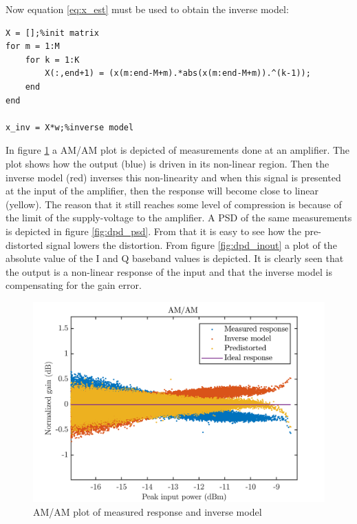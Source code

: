 Now equation \ref{eq:x_est} must be used to obtain the inverse model:

\begin{lstlisting}[frame = single]
X = [];%init matrix
for m = 1:M
    for k = 1:K
        X(:,end+1) = (x(m:end-M+m).*abs(x(m:end-M+m)).^(k-1));
    end
end

x_inv = X*w;%inverse model
\end{lstlisting}


In figure \ref{fig:dpd_amam} a AM/AM plot is depicted of measurements done at an amplifier. The plot shows how the output (blue) is driven in its non-linear region. Then the inverse model (red) inverses this non-linearity and when this signal is presented at the input of the amplifier, then the response will become close to linear (yellow). The reason that it still reaches some level of compression is because of the limit of the supply-voltage to the amplifier. A PSD of the same measurements is depicted in figure \ref{fig:dpd_psd}. From that it is easy to see how the pre-distorted signal lowers the distortion. From figure \ref{fig:dpd_inout} a plot of the absolute value of the I and Q baseband values is depicted. It is clearly seen that the output is a non-linear response of the input and that the inverse model is compensating for the gain error.  


\begin{figure}[H]
\centering 
\includegraphics[scale = 0.7]{figures/measurement/predis.png}
\caption{AM/AM plot of measured response and inverse model}
\label{fig:dpd_amam}
\end{figure}


